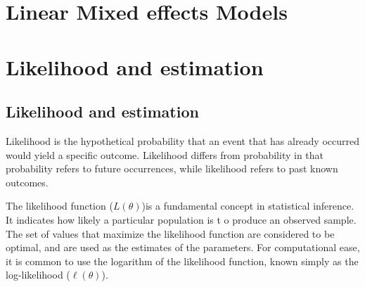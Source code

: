 \documentclass[12pt, a4paper]{report}
\theoremstyle{plain}
\theoremstyle{definition}
\theoremstyle{remark}
\begin{document}









\section{Linear Mixed effects Models}





\section{Likelihood and estimation}

\subsection{Likelihood and estimation}

Likelihood is the hypothetical probability that an event that has
already occurred would yield a specific outcome. Likelihood
differs from probability in that probability refers to future
occurrences, while likelihood refers to past known outcomes.

The likelihood function ($L(\theta)$)is a fundamental concept in statistical
inference. It indicates how likely a particular population is t o
produce an observed sample. The set of values that maximize the
likelihood function are considered to be optimal, and are used as
the estimates of the parameters. For computational ease, it is common to use the logarithm of the likelihood function, known simply as the log-likelihood ($\ell(\theta)$).
\end{document}
